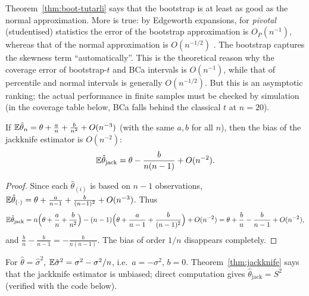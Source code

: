 \documentclass[main.tex]{subfiles}
\begin{document}
\begin{remark}
Theorem~\ref{thm:boot-tutarli} says that the bootstrap is at least as good as the normal approximation. More is true: by Edgeworth expansions, for \emph{pivotal} (studentised) statistics the error of the bootstrap approximation is $O_P(n^{-1})$, whereas that of the normal approximation is $O(n^{-1/2})$ \cite{hall}. The bootstrap captures the skewness term ``automatically''. This is the theoretical reason why the coverage error of bootstrap-$t$ and BCa intervals is $O(n^{-1})$, while that of percentile and normal intervals is generally $O(n^{-1/2})$. But this is an asymptotic ranking; the actual performance in finite samples must be checked by simulation (in the coverage table below, BCa falls behind the classical $t$ at $n=20$).
\end{remark}

\begin{theorem}\label{thm:jackknife}
If $\mathbb{E}\hat\theta_n=\theta+\frac{a}{n}+\frac{b}{n^2}+O(n^{-3})$ (with the same $a,b$ for all $n$), then the bias of the jackknife estimator is $O(n^{-2})$:
\[
\mathbb{E}\hat\theta_{\text{jack}}=\theta-\frac{b}{n(n-1)}+O(n^{-2}) .
\]
\end{theorem}
\begin{proof}
Since each $\hat\theta_{(i)}$ is based on $n-1$ observations, $\mathbb{E}\hat\theta_{(\cdot)}=\theta+\frac{a}{n-1}+\frac{b}{(n-1)^2}+O(n^{-3})$. Thus
\[
\mathbb{E}\hat\theta_{\text{jack}}=n\Big(\theta+\frac an+\frac b{n^2}\Big)-(n-1)\Big(\theta+\frac a{n-1}+\frac b{(n-1)^2}\Big)+O(n^{-2})=\theta+\frac bn-\frac b{n-1}+O(n^{-2}),
\]
and $\frac bn-\frac b{n-1}=-\frac{b}{n(n-1)}$. The bias of order $1/n$ disappears completely.
\end{proof}

\begin{example}
For $\hat\theta=\hat\sigma^2$, $\mathbb{E}\hat\sigma^2=\sigma^2-\sigma^2/n$, i.e.\ $a=-\sigma^2$, $b=0$. Theorem~\ref{thm:jackknife} says that the jackknife estimator is unbiased; direct computation gives $\hat\theta_{\text{jack}}=S^2$ (verified with the code below).
\end{example}
\end{document}
